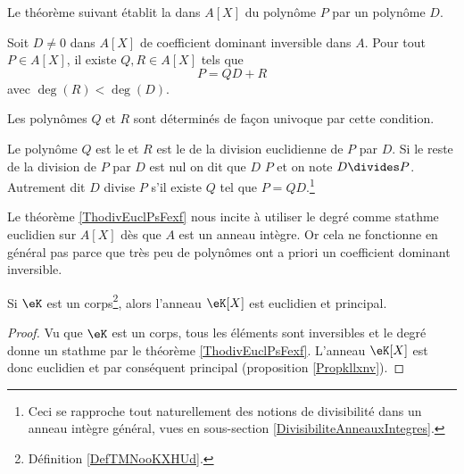 Le théorème suivant établit la  dans \( A[X]\) du polynôme \( P\) par un polynôme \( D\).
\begin{theorem}     \label{ThodivEuclPsFexf}
    Soit \( D\neq 0\) dans \( A[X]\) de coefficient dominant inversible dans \( A\). Pour tout \( P\in A[X]\), il existe \( Q,R\in A[X]\) tels que
    \begin{equation}
        P=QD+R
    \end{equation}
    avec \( \deg(R)<\deg(D)\).

    Les polynômes \( Q\) et \( R\) sont déterminés de façon univoque par cette condition. 
\end{theorem}

\begin{definition}\label{DefMPZooMmMymG}
    Le polynôme \( Q\) est le  et \( R\) est le  de la division euclidienne de \( P\) par \( D\). Si le reste de la division de \( P\) par $D$ est nul on dit que \( D\)  \( P\) et on note \( D\divides P\). Autrement dit \( D\) divise \( P\) s'il existe \( Q\) tel que \( P=QD\).\footnote{Ceci se rapproche tout naturellement des notions de divisibilité dans un anneau intègre général, vues en sous-section \ref{DivisibiliteAnneauxIntegres}.}
\end{definition}

\begin{normaltext}
    Le théorème \ref{ThodivEuclPsFexf} nous incite à utiliser le degré comme stathme euclidien sur \( A[X]\) dès que \( A\) est un anneau intègre. Or cela ne fonctionne en général pas parce que très peu de polynômes ont a priori un coefficient dominant inversible.
\end{normaltext}

\begin{lemma}       \label{LEMooIDSKooQfkeKp}
    Si \( \eK\) est un corps\footnote{Définition \ref{DefTMNooKXHUd}.}, alors l'anneau \( \eK[X]\) est euclidien et principal.
\end{lemma}

\begin{proof}
    Vu que \( \eK\) est un corps, tous les éléments sont inversibles et le degré donne un stathme par le théorème \ref{ThodivEuclPsFexf}. L'anneau \( \eK[X]\) est donc euclidien et par conséquent principal (proposition \ref{Propkllxnv}). 
\end{proof}

